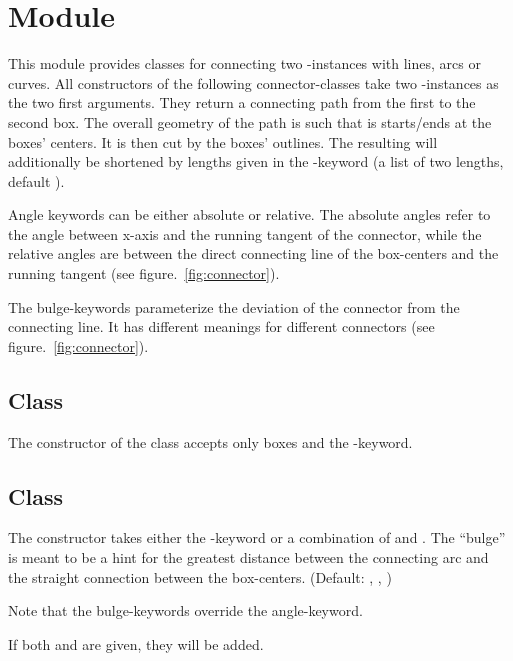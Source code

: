 \chapter{Module }
\label{connector}

This module provides classes for connecting two -instances with
lines, arcs or curves. All constructors of the following connector-classes take
two -instances as the two first arguments. They return a connecting
path from the first to the second box. The overall geometry of the path is such
that is starts/ends at the boxes' centers. It is then cut by the boxes'
outlines. The resulting  will additionally be shortened by
lengths given in the -keyword (a list of two lengths, default
\code{[0,0]}).

Angle keywords can be either absolute or relative. The absolute angles refer to
the angle between x-axis and the running tangent of the connector, while the
relative angles are between the direct connecting line of the box-centers and
the running tangent (see figure.~\ref{fig:connector}).

The bulge-keywords parameterize the deviation of the connector from the
connecting line. It has different meanings for different connectors (see
figure.~\ref{fig:connector}).

\section{Class }

The constructor of the  class accepts only boxes and the
-keyword.

\section{Class }

The constructor takes either the -keyword or a
combination of  and . The ``bulge'' is
meant to be a hint for the greatest distance between the connecting arc and the
straight connection between the box-centers. (Default: ,
, )\smallskip

Note that the bulge-keywords override the angle-keyword.

If both  and  are given, they will be
added.

